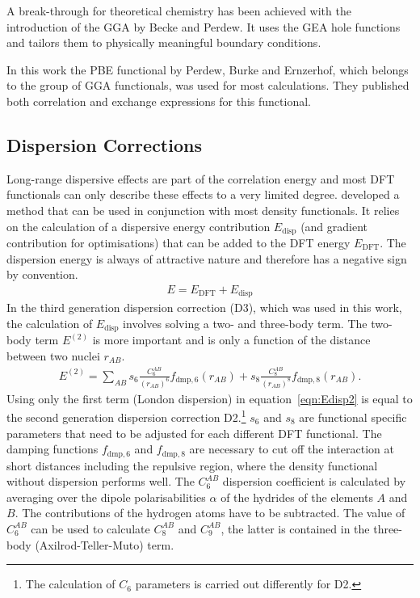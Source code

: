 A break-through for theoretical chemistry has been achieved with the
introduction of the \ac{GGA} by Becke and Perdew. It uses the \ac{GEA} hole functions and tailors
them to physically meaningful boundary conditions. 

In this work the PBE functional by Perdew, Burke and Ernzerhof\autocite{Perdew_GeneralizedGradientApproximation_1996,Perdew_GeneralizedGradientApproximation_1997},
which belongs to the group of \ac{GGA} functionals, was used for most
calculations. They published both correlation and exchange expressions for
this functional.

\subsection{Dispersion Corrections}
\label{sec:dispersioncorrections}

Long-range dispersive effects are part of the correlation energy and most
\ac{DFT} functionals can only describe these effects to a very limited degree.
\citeauthor{Grimme_consistentaccurateinitio_2010} developed a method that can
be used in conjunction with most density
functionals.\autocite{Grimme_consistentaccurateinitio_2010} It relies on the
calculation of a dispersive energy contribution $E_\text{disp}$ (and gradient
contribution for optimisations) that can be added to the \ac{DFT} energy
$E_\text{DFT}$. The dispersion energy is always of attractive nature and
therefore has a negative sign by convention.
%
\begin{align}
	E = E_\text{DFT} + E_\text{disp}
\end{align}
%
In the third generation dispersion correction (D3), which was used in this work,
the calculation of $E_\text{disp}$ involves solving a two- and three-body term.
The two-body term $E^{(2)}$ is more important and is only a function of the
distance between two nuclei $r_{AB}$.
%
\begin{align}
	E^{(2)}=\sum\limits_{AB}s_6\frac{C_6^{AB}}{\left(r_{AB}\right)^6}f_{\text{dmp},6}(r_{AB}) + s_8\frac{C_8^{AB}}{\left(r_{AB}\right)^8}f_{\text{dmp},8}(r_{AB}).\label{eqn:Edisp2}
\end{align}
%
Using only the first term (London dispersion) in equation~\eqref{eqn:Edisp2} is equal to the
second generation dispersion correction D2.\footnote{The calculation of $C_6$
parameters is carried out differently for D2.} $s_6$ and $s_8$ are functional
specific parameters that need to be adjusted for each different \ac{DFT}
functional. The damping functions $f_{\text{dmp},6}$ and $f_{\text{dmp},8}$ are
necessary to cut off the interaction at short distances including the repulsive
region, where the density functional without dispersion performs well. The $C_6^{AB}$
dispersion coefficient is calculated by averaging over the dipole
polarisabilities $\alpha$ of the hydrides of the elements $A$ and $B$. The
contributions of the hydrogen atoms have to be subtracted. The value of
$C_6^{AB}$ can be used to calculate $C_8^{AB}$ and $C_9^{AB}$, the latter is
contained in the three-body (Axilrod-Teller-Muto) term.

